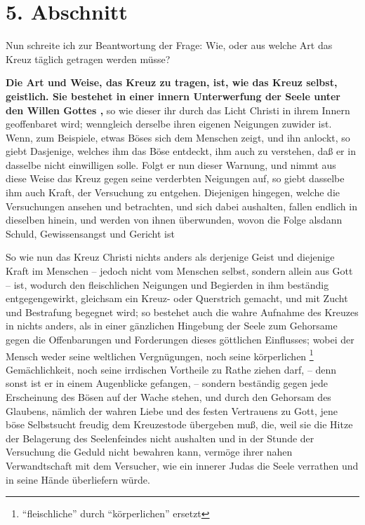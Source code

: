 \section{5. Abschnitt} \label{kap3_ab5} 

Nun schreite ich zur Beantwortung der Frage: Wie, oder aus welche Art das Kreuz
täglich getragen werden müsse?

\medskip

\textbf{Die Art und Weise, das Kreuz zu tragen, ist, wie das Kreuz selbst,
geistlich.
Sie bestehet in einer innern Unterwerfung der Seele unter den Willen Gottes ,} so
wie dieser ihr durch das Licht Christi in ihrem Innern geoffenbaret wird;
wenngleich derselbe ihren eigenen Neigungen zuwider ist. Wenn, zum Beispiele,
etwas Böses sich dem Menschen zeigt, und ihn anlockt, so giebt Dasjenige,
welches ihm das Böse entdeckt, ihm auch zu verstehen, daß er in dasselbe nicht
einwilligen solle. Folgt er nun dieser Warnung, und nimmt aus diese Weise das
Kreuz gegen seine verderbten Neigungen auf, so giebt dasselbe ihm auch Kraft,
der Versuchung zu entgehen. Diejenigen hingegen, welche die Versuchungen ansehen
und betrachten, und sich dabei aushalten, fallen endlich in dieselben hinein,
und werden von ihnen überwunden, wovon die Folge alsdann Schuld, Gewissensangst
und Gericht ist

\medskip

So wie nun das Kreuz Christi nichts anders als derjenige Geist und diejenige
Kraft im Menschen -- jedoch nicht vom Menschen selbst, sondern allein aus Gott --
ist, wodurch den fleischlichen Neigungen und Begierden in ihm beständig
entgegengewirkt, gleichsam ein Kreuz- oder Querstrich gemacht, und mit Zucht und
Bestrafung begegnet wird; so bestehet auch die wahre Aufnahme des Kreuzes in
nichts anders, als in einer gänzlichen Hingebung der Seele zum Gehorsame gegen
die Offenbarungen und Forderungen dieses göttlichen Einflusses; wobei der Mensch
weder seine weltlichen Vergnügungen, noch seine körperlichen \footnote{"`fleischliche"' durch "`körperlichen"' ersetzt} Gemächlichkeit,
noch seine irrdischen Vortheile zu Rathe ziehen darf, -- denn sonst ist er in
einem Augenblicke gefangen, -- sondern beständig gegen jede Erscheinung des
Bösen auf der Wache stehen, und durch den Gehorsam des Glaubens, nämlich der
wahren Liebe und des festen Vertrauens zu Gott, jene böse Selbstsucht freudig
dem Kreuzestode übergeben muß, die, weil sie die Hitze der Belagerung des
Seelenfeindes nicht aushalten und in der Stunde der Versuchung die Geduld nicht
bewahren kann, vermöge ihrer nahen Verwandtschaft mit dem Versucher, wie ein
innerer Judas die Seele verrathen und in seine Hände überliefern würde.




